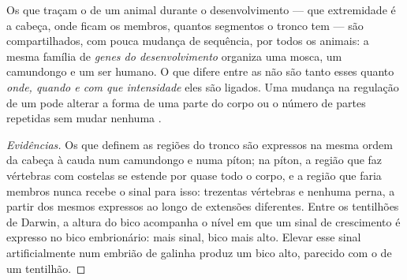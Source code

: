 \begin{proposition}\label{prop:g12:diversification-of-life:development}
Os  que traçam o  de um animal durante o
desenvolvimento --- que extremidade é a cabeça, onde ficam os membros,
quantos segmentos o tronco tem --- são compartilhados, com pouca
mudança de sequência, por todos os animais: a mesma família de
\emph{genes do desenvolvimento} organiza
uma mosca, um camundongo e um ser humano. O que difere entre as
 não são tanto esses  quanto \emph{onde, quando e com que
intensidade} eles são ligados. Uma mudança na regulação de um  pode alterar a forma de uma parte do corpo ou o número
de partes repetidas sem mudar nenhuma .
\end{proposition}
\begin{proof}[Evidências]
Os  que definem as regiões do tronco são expressos na mesma ordem
da cabeça à cauda num camundongo e numa píton; na píton, a região que
faz vértebras com costelas se estende por quase todo o corpo, e a
região que faria membros nunca recebe o sinal para isso: trezentas
vértebras e nenhuma perna, a partir dos mesmos  expressos ao longo
de extensões diferentes. Entre os tentilhões de Darwin, a altura do
bico acompanha o nível em que um sinal de crescimento é expresso no
bico embrionário: mais sinal, bico mais alto. Elevar esse sinal
artificialmente num embrião de galinha produz um bico alto, parecido
com o de um tentilhão.
\end{proof}

